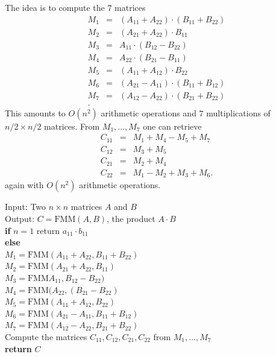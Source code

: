 The idea is to compute the $7$ matrices
\begin{eqnarray*}
  M_1 & = & (A_{11} + A_{22}) \cdot (B_{11}+ B_{22}) \\
  M_2 & = & (A_{21} + A_{22}) \cdot B_{11} \\
  M_3 & = & A_{11} \cdot (B_{12} - B_{22}) \\
  M_4 & = & A_{22} \cdot (B_{21} - B_{11}) \\
  M_5 & = & (A_{11} + A_{12})\cdot B_{22} \\
  M_6 & = & (A_{21}-A_{11}) \cdot (B_{11}+B_{12}) \\
  M_7 & = & (A_{12}-A_{22}) \cdot  (B_{21} + B_{22})\\. 
\end{eqnarray*}
This amounts to $O(n^2)$ arithmetic operations and $7$ multiplications of $n/2 × n/2$ matrices. From $M_1,\dots,M_7$ one can retrieve 
\begin{eqnarray*}
C_{11} & = & M_1 + M_4 - M_5 + M_7\\
C_{12} & = & M_3 + M_5 \\
C_{21} & = & M_2 + M_4\\
C_{22} & = & M_1 - M_2 + M_3 + M_6.  
\end{eqnarray*}
again with $O(n^2)$ arithmetic operations. 


\begin{algorithm}

  \begin{tabbing}
    Input: Two $n ×n$ matrices $A$ and $B$ \\
    Output: $C = \mathrm{FMM}(A,B)$, the product $ A\cdot B$ \\

    {\bf if}  $n=1$ return $a_{11} ⋅b_{11}$ \\
    {\bf else} \=  \\
               \>  $M_1 = \mathrm{FMM} (A_{11} + A_{22} , B_{11}+ B_{22}) $ \\
               \> $M_2 = \mathrm{FMM}(A_{21} + A_{22},  B_{11})$ \\
               \> $M_3  = \mathrm{FMM} A_{11} , B_{12} - B_{22}) $\\
               \> $M_4  = \mathrm{FMM}( A_{22} , (B_{21} - B_{22})$ \\
               \> $M_5  = \mathrm{FMM}(A_{11} + A_{12}, B_{22})$ \\
               \> $M_6  = \mathrm{FMM} (A_{21}-A_{11}, B_{11}+B_{12}) $\\
               \> $M_7  = \mathrm{FMM} (A_{12}-A_{22}, B_{21} + B_{22})$\\ 
               \> Compute the matrices $C_{11}, C_{12}, C_{21}, C_{22}$ from $M_1,\dots,M_7$ \\
               \> {\bf return} $C$
  \end{tabbing}
\end{algorithm}

